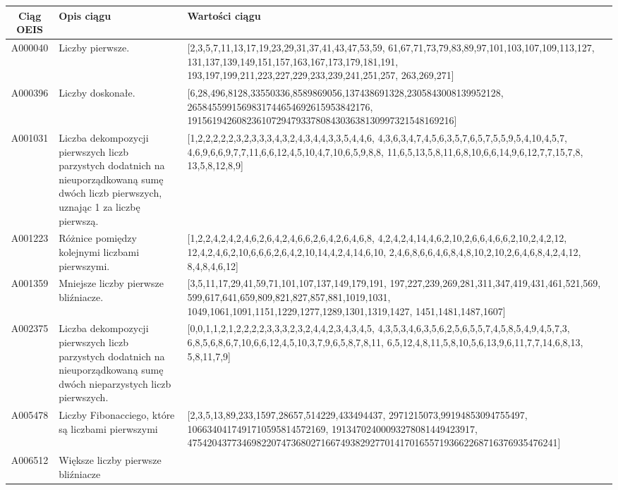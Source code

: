 \documentclass[10pt,onecolumn]{article}
\theoremstyle{definition}
\theoremstyle{hypothesis}
\theoremstyle{capability}
\begin{document}
\begin{landscape}
\begin{tabularx}{\linewidth}{ |c|X|X| }
  \hline 
  \rowcolor{LightCyan}
  Ciąg OEIS & Opis ciągu & Wartości ciągu \\
  \hline
A000040 & Liczby pierwsze. &
[2,3,5,7,11,13,17,19,23,29,31,37,41,43,47,53,59,
 61,67,71,73,79,83,89,97,101,103,107,109,113,127,
 131,137,139,149,151,157,163,167,173,179,181,191,
 193,197,199,211,223,227,229,233,239,241,251,257,
 263,269,271] \\
  \hline
A000396 & Liczby doskonałe. &
[6,28,496,8128,33550336,8589869056,137438691328,2305843008139952128,
 2658455991569831744654692615953842176,
 191561942608236107294793378084303638130997321548169216] \\
  \hline
A001031 & Liczba dekompozycji pierwszych liczb parzystych dodatnich na nieuporządkowaną sumę dwóch liczb pierwszych, uznając 1 za liczbę pierwszą. & 
[1,2,2,2,2,2,3,2,3,3,3,4,3,2,4,3,4,4,3,3,5,4,4,6,
 4,3,6,3,4,7,4,5,6,3,5,7,6,5,7,5,5,9,5,4,10,4,5,7,
 4,6,9,6,6,9,7,7,11,6,6,12,4,5,10,4,7,10,6,5,9,8,8,
 11,6,5,13,5,8,11,6,8,10,6,6,14,9,6,12,7,7,15,7,8,
 13,5,8,12,8,9] \\
  \hline
A001223 & Różnice pomiędzy kolejnymi liczbami pierwszymi. & 
[1,2,2,4,2,4,2,4,6,2,6,4,2,4,6,6,2,6,4,2,6,4,6,8,
 4,2,4,2,4,14,4,6,2,10,2,6,6,4,6,6,2,10,2,4,2,12,
 12,4,2,4,6,2,10,6,6,6,2,6,4,2,10,14,4,2,4,14,6,10,
 2,4,6,8,6,6,4,6,8,4,8,10,2,10,2,6,4,6,8,4,2,4,12,
 8,4,8,4,6,12] \\
  \hline
A001359 & Mniejsze liczby pierwsze bliźniacze. & 
[3,5,11,17,29,41,59,71,101,107,137,149,179,191,
 197,227,239,269,281,311,347,419,431,461,521,569,
 599,617,641,659,809,821,827,857,881,1019,1031,
 1049,1061,1091,1151,1229,1277,1289,1301,1319,1427,
 1451,1481,1487,1607] \\
  \hline
A002375 & Liczba dekompozycji pierwszych liczb parzystych dodatnich na nieuporządkowaną sumę dwóch nieparzystych liczb pierwszych. & 
[0,0,1,1,2,1,2,2,2,2,3,3,3,2,3,2,4,4,2,3,4,3,4,5,
 4,3,5,3,4,6,3,5,6,2,5,6,5,5,7,4,5,8,5,4,9,4,5,7,3,
 6,8,5,6,8,6,7,10,6,6,12,4,5,10,3,7,9,6,5,8,7,8,11,
 6,5,12,4,8,11,5,8,10,5,6,13,9,6,11,7,7,14,6,8,13,
 5,8,11,7,9] \\
  \hline
A005478 & Liczby Fibonacciego, które są liczbami pierwszymi & 
[2,3,5,13,89,233,1597,28657,514229,433494437,
 2971215073,99194853094755497,
 1066340417491710595814572169,
 19134702400093278081449423917,
 475420437734698220747368027166749382927701417016557193662268716376935476241] \\
 \hline
A006512 & Większe liczby pierwsze bliźniacze & 

\end{tabularx}
\end{landscape}
\end{document}
